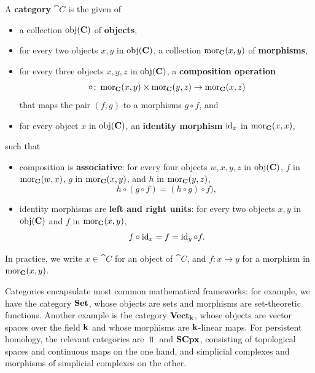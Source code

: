 \begin{definition}
\label{!D:category}
  A \textbf{category} $\cat{C}$ is the given of
  \begin{itemize}
    \item a collection $\operatorname{obj}(\mathbf{C})$ of \textbf{objects},
    \item for every two objects $x, y$ in $\operatorname{obj}(\mathbf{C})$, a collection $\operatorname{mor}_{\mathbf{C}}(x, y)$ of \textbf{morphisms},
    \item for every three objects $x, y, z$ in $\operatorname{obj}(\mathbf{C})$, a \textbf{composition operation}
    \[
      \circ \colon \operatorname{mor}_{\mathbf{C}}(x, y) \times \operatorname{mor}_{\mathbf{C}}(y, z) \to \operatorname{mor}_{\mathbf{C}}(x, z)
    \]
    that maps the pair $(f, g)$ to a morphisms $g \circ f$, and
    \item for every object $x$ in $\operatorname{obj}(\mathbf{C})$, an \textbf{identity morphism} $\operatorname{id}_x$ in $\operatorname{mor}_{\mathbf{C}}(x, x)$,
  \end{itemize}
  such that
  \begin{itemize}
    \item composition is \textbf{associative}: for every four objects $w, x, y, z$ in $\operatorname{obj}(\mathbf{C})$, $f$ in $\operatorname{mor}_{\mathbf{C}}(w, x)$, $g$ in $\operatorname{mor}_{\mathbf{C}}(x, y)$, and $h$ in $\operatorname{mor}_{\mathbf{C}}(y, z)$,
    \[
      h \circ (g \circ f) = (h \circ g) \circ f),
    \]
    \item identity morphisms are \textbf{left and right units}: for every two objects $x, y$ in $\operatorname{obj}(\mathbf{C})$ and $f$ in $\operatorname{mor}_{\mathbf{C}}(x, y)$,
    \[
      f \circ \operatorname{id}_x = f = \operatorname{id}_y \circ f.
    \]
  \end{itemize}
  In practice, we write $x \in \cat{C}$ for an object of $\cat{C}$, and $f \colon x \to y$ for a morphism in $\operatorname{mor}_{\mathbf{C}}(x, y)$.
\end{definition}

\begin{example}
  Categories encapsulate most common mathematical frameworks: for example, we have the category $\operatorname{\mathbf{Set}}$, whose objects are sets and morphisms are set-theoretic functions. Another example is the category $\operatorname{\mathbf{Vect}}_{\mathbf{k}}$, whose objects are vector spaces over the field $\mathbf{k}$ and whose morphisms are $\mathbf{k}$-linear maps. For persistent homology, the relevant categories are $\Top$ and $\operatorname{\mathbf{SCpx}}$, consisting of topological spaces and continuous maps on the one hand, and simplicial complexes and morphisms of simplicial complexes on the other.
\end{example}

